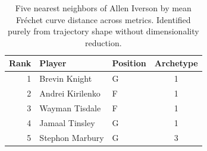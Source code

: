 \begin{table}[htbp]
  \centering\small
  \begin{tabular}{rllc}
    \toprule
    Rank & Player & Position & Archetype \\
    \midrule
    1 & Brevin Knight & G & 1 \\
    2 & Andrei Kirilenko & F & 1 \\
    3 & Wayman Tisdale & F & 1 \\
    4 & Jamaal Tinsley & G & 1 \\
    5 & Stephon Marbury & G & 3 \\
    \bottomrule
  \end{tabular}
  \caption{Five nearest neighbors of Allen Iverson by mean Fr\'{e}chet curve distance across metrics. Identified purely from trajectory shape without dimensionality reduction.}
  \label{tab:Allen_Iverson_frechet_curve_neighbors}
\end{table}


